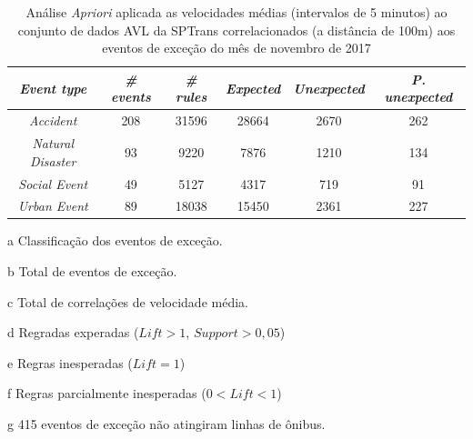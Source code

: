 \documentclass[
	12pt,				%
	oneside,			%
	a4paper,			%
	english,			%
	brazil				%
	]{abntex2ppgsi}
\begin{document}
{{\begin{apendicesenv}
\begin{table}[!htb]
\centering
\begin{threeparttable}
\caption {Análise \textit{Apriori} aplicada as velocidades médias (intervalos de 5 minutos) ao conjunto de dados AVL da SPTrans correlacionados (a distância de 100m) aos eventos de exceção do mês de novembro de 2017}
\label {tab:aprioriFull}
\begin{tabular}{c|c|c|c|c|c}
\hline
\textbf{\textit{Event type}}\tnote{a} & \textbf{\textit{\# events}}\tnote{b} & \textit{\textbf{\# rules}}\tnote{c} & \textbf{\textit{Expected}}\tnote{d} & \textbf{\textit{Unexpected}}\tnote{e} & \textbf{\textit{P. unexpected}}\tnote{f}   \\
\hline
\textit{Accident} & 208 & 31596 & 28664 & 2670 & 262 \\
\textit{Natural Disaster} & 93 & 9220 & 7876 & 1210 & 134 \\
\textit{Social Event} & 49 & 5127 & 4317 & 719 & 91 \\
\textit{Urban Event} & 89 & 18038 & 15450 & 2361 & 227 \\
\hline
\end{tabular}
\begin{tablenotes}
            \item[a] Classificação dos eventos de exceção.
            \item[b] Total de eventos de exceção.
            \item[c] Total de correlações de velocidade média.
            \item[d] Regradas experadas ($Lift > 1$, $Support > 0,05$)
            \item[e] Regras inesperadas ($Lift = 1$)
            \item[f] Regras parcialmente inesperadas ($0 < Lift < 1$)
            \item[g] 415 eventos de exceção não atingiram linhas de ônibus.
        \end{tablenotes}
\end{threeparttable}
\end{table}


\end{apendicesenv}}}
\end{document}

